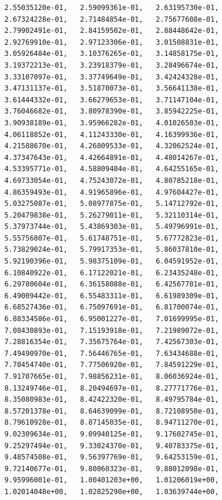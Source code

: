 \documentclass[11pt]{article}
\begin{document}
\begin{verbatim}
         2.55035120e-01,   2.59099361e-01,   2.63195730e-01,
         2.67324228e-01,   2.71484854e-01,   2.75677608e-01,
         2.79902491e-01,   2.84159502e-01,   2.88448642e-01,
         2.92769910e-01,   2.97123306e-01,   3.01508831e-01,
         3.05926484e-01,   3.10376265e-01,   3.14858175e-01,
         3.19372213e-01,   3.23918379e-01,   3.28496674e-01,
         3.33107097e-01,   3.37749649e-01,   3.42424328e-01,
         3.47131137e-01,   3.51870073e-01,   3.56641138e-01,
         3.61444332e-01,   3.66279653e-01,   3.71147104e-01,
         3.76046682e-01,   3.80978390e-01,   3.85942225e-01,
         3.90938189e-01,   3.95966282e-01,   4.01026503e-01,
         4.06118852e-01,   4.11243330e-01,   4.16399936e-01,
         4.21588670e-01,   4.26809533e-01,   4.32062524e-01,
         4.37347643e-01,   4.42664891e-01,   4.48014267e-01,
         4.53395771e-01,   4.58809404e-01,   4.64255165e-01,
         4.69733054e-01,   4.75243072e-01,   4.80785218e-01,
         4.86359493e-01,   4.91965896e-01,   4.97604427e-01,
         5.03275087e-01,   5.08977875e-01,   5.14712792e-01,
         5.20479838e-01,   5.26279011e-01,   5.32110314e-01,
         5.37973744e-01,   5.43869303e-01,   5.49796991e-01,
         5.55756807e-01,   5.61748751e-01,   5.67772823e-01,
         5.73829024e-01,   5.79917353e-01,   5.86037810e-01,
         5.92190396e-01,   5.98375109e-01,   6.04591952e-01,
         6.10840922e-01,   6.17122021e-01,   6.23435248e-01,
         6.29780604e-01,   6.36158088e-01,   6.42567701e-01,
         6.49009442e-01,   6.55483311e-01,   6.61989309e-01,
         6.68527436e-01,   6.75097691e-01,   6.81700074e-01,
         6.88334586e-01,   6.95001227e-01,   7.01699995e-01,
         7.08430893e-01,   7.15193918e-01,   7.21989072e-01,
         7.28816354e-01,   7.35675764e-01,   7.42567303e-01,
         7.49490970e-01,   7.56446765e-01,   7.63434688e-01,
         7.70454740e-01,   7.77506920e-01,   7.84591229e-01,
         7.91707665e-01,   7.98856231e-01,   8.06036924e-01,
         8.13249746e-01,   8.20494697e-01,   8.27771776e-01,
         8.35080983e-01,   8.42422320e-01,   8.49795784e-01,
         8.57201378e-01,   8.64639099e-01,   8.72108950e-01,
         8.79610928e-01,   8.87145035e-01,   8.94711270e-01,
         9.02309634e-01,   9.09940125e-01,   9.17602745e-01,
         9.25297494e-01,   9.33024370e-01,   9.40783375e-01,
         9.48574508e-01,   9.56397769e-01,   9.64253159e-01,
         9.72140677e-01,   9.80060323e-01,   9.88012098e-01,
         9.95996001e-01,   1.00401203e+00,   1.01206019e+00,
         1.02014048e+00,   1.02825290e+00,   1.03639744e+00,

\end{verbatim}
\end{document}

